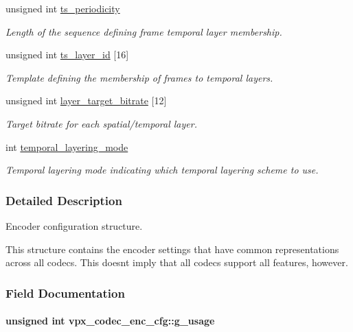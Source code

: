 \begin{DoxyCompactItemize}
unsigned int \hyperlink{structvpx__codec__enc__cfg_a4ec338780115dd270acf0dac24193474}{ts\+\_\+periodicity}
\begin{DoxyCompactList}\small\item\em Length of the sequence defining frame temporal layer membership. \end{DoxyCompactList}\item 
unsigned int \hyperlink{structvpx__codec__enc__cfg_a4d105d2470dbfb7210b33d298f1cf1f6}{ts\+\_\+layer\+\_\+id} \mbox{[}16\mbox{]}
\begin{DoxyCompactList}\small\item\em Template defining the membership of frames to temporal layers. \end{DoxyCompactList}\item 
unsigned int \hyperlink{structvpx__codec__enc__cfg_a3f6b4c8aea7a713c51ad5d44e3552b1f}{layer\+\_\+target\+\_\+bitrate} \mbox{[}12\mbox{]}
\begin{DoxyCompactList}\small\item\em Target bitrate for each spatial/temporal layer. \end{DoxyCompactList}\item 
int \hyperlink{structvpx__codec__enc__cfg_a07c78dd29423d5ab475b9d77a0107d16}{temporal\+\_\+layering\+\_\+mode}
\begin{DoxyCompactList}\small\item\em Temporal layering mode indicating which temporal layering scheme to use. \end{DoxyCompactList}\end{DoxyCompactItemize}


\subsubsection{Detailed Description}
Encoder configuration structure. 

This structure contains the encoder settings that have common representations across all codecs. This doesn\textquotesingle{}t imply that all codecs support all features, however. 

\subsubsection{Field Documentation}
\paragraph[{\texorpdfstring{g\+\_\+usage}{g_usage}}]{\setlength{\rightskip}{0pt plus 5cm}unsigned int vpx\+\_\+codec\+\_\+enc\+\_\+cfg\+::g\+\_\+usage}\hypertarget{structvpx__codec__enc__cfg_a5bcf7fc1efc4890de351e3c6fe252355}{}\label{structvpx__codec__enc__cfg_a5bcf7fc1efc4890de351e3c6fe252355}



